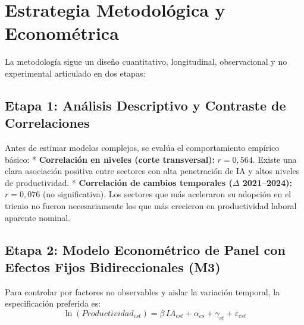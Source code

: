 \documentclass[12pt,a4paper]{article}
\begin{document}
\section{Estrategia Metodológica y Econométrica}

La metodología sigue un diseño cuantitativo, longitudinal, observacional y no experimental articulado en dos etapas:

\subsection{Etapa 1: Análisis Descriptivo y Contraste de Correlaciones}
Antes de estimar modelos complejos, se evalúa el comportamiento empírico básico:
* \textbf{Correlación en niveles (corte transversal):} $r = 0,564$. Existe una clara asociación positiva entre sectores con alta penetración de IA y altos niveles de productividad.
* \textbf{Correlación de cambios temporales ($\Delta$ 2021--2024):} $r = 0,076$ (no significativa). Los sectores que más aceleraron su adopción en el trienio no fueron necesariamente los que más crecieron en productividad laboral aparente nominal.

\subsection{Etapa 2: Modelo Econométrico de Panel con Efectos Fijos Bidireccionales (M3)}
Para controlar por factores no observables y aislar la variación temporal, la especificación preferida es:
\begin{equation}
  \ln(Productividad_{cst}) = \beta \, IA_{cst} + \alpha_{cs} + \gamma_{ct} + \varepsilon_{cst}
\end{equation}
\end{document}
